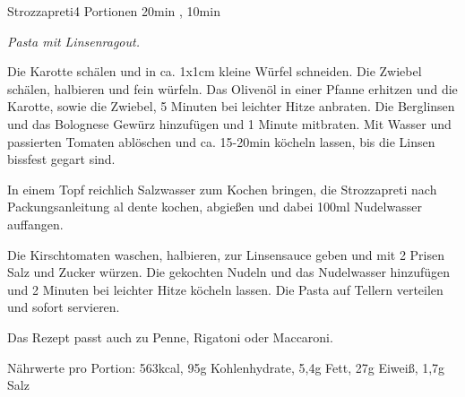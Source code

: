 \documentclass[../recipe-collections/cooking.tex]{subfiles}
\begin{document}
\begin{recipe}{Strozzapreti}{4 Portionen }{20min , 10min }

  \freeform{}\textit{Pasta mit Linsenragout.}


  Die Karotte schälen und in ca. 1x1cm kleine Würfel schneiden.
  Die Zwiebel schälen, halbieren und fein würfeln.
  Das Olivenöl in einer Pfanne erhitzen und die Karotte, sowie die Zwiebel, 5 Minuten bei leichter Hitze anbraten.
  Die Berglinsen und das Bolognese Gewürz hinzufügen und 1 Minute mitbraten.
  Mit Wasser und passierten Tomaten ablöschen und ca. 15-20min köcheln lassen, bis die Linsen bissfest gegart sind.


  In einem Topf reichlich Salzwasser zum Kochen bringen, die Strozzapreti nach Packungsanleitung al dente kochen, abgießen und dabei 100ml Nudelwasser auffangen.


  Die Kirschtomaten waschen, halbieren, zur Linsensauce geben und mit 2 Prisen Salz und Zucker würzen.
  Die gekochten Nudeln und das Nudelwasser hinzufügen und 2 Minuten bei leichter Hitze köcheln lassen.
  Die Pasta auf Tellern verteilen und sofort servieren.

  \freeform{}\hrulefill{}

  \freeform{}
  Das Rezept passt auch zu Penne, Rigatoni oder Maccaroni.

  \freeform{}
  Nährwerte pro Portion: 563kcal, 95g Kohlenhydrate, 5,4g Fett, 27g Eiweiß, 1,7g Salz

\end{recipe}
\end{document}
